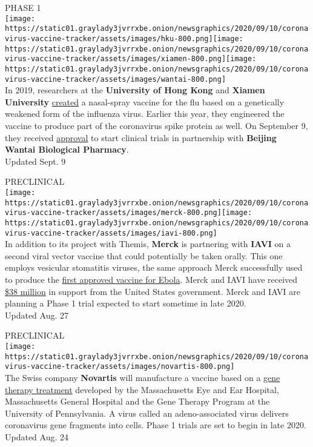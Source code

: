 PHASE 1\\
\texttt{[image: https://static01.graylady3jvrrxbe.onion/newsgraphics/2020/09/10/coronavirus-vaccine-tracker/assets/images/hku-800.png]}\texttt{[image: https://static01.graylady3jvrrxbe.onion/newsgraphics/2020/09/10/coronavirus-vaccine-tracker/assets/images/xiamen-800.png]}\texttt{[image: https://static01.graylady3jvrrxbe.onion/newsgraphics/2020/09/10/coronavirus-vaccine-tracker/assets/images/wantai-800.png]}\\
In 2019, researchers at the \textbf{\textbf{University of Hong Kong}}
and \textbf{\textbf{Xiamen University}}
\href{https://mbio.asm.org/content/10/5/e02180-19}{created} a
nasal-spray vaccine for the flu based on a genetically weakened form of
the influenza virus. Earlier this year, they engineered the vaccine to
produce part of the coronavirus spike protein as well. On September 9,
they received
\href{https://www.hku.hk/press/news_detail_21583.html}{approval} to
start clinical trials in partnership with \textbf{\textbf{Beijing Wantai
Biological Pharmacy}}.\\
Updated Sept. 9

PRECLINICAL\\
\texttt{[image: https://static01.graylady3jvrrxbe.onion/newsgraphics/2020/09/10/coronavirus-vaccine-tracker/assets/images/merck-800.png]}\texttt{[image: https://static01.graylady3jvrrxbe.onion/newsgraphics/2020/09/10/coronavirus-vaccine-tracker/assets/images/iavi-800.png]}\\
In addition to its project with Themis, \textbf{\textbf{Merck}} is
partnering with \textbf{\textbf{IAVI}} on a second viral vector vaccine
that could potentially be taken orally. This one employs vesicular
stomatitis viruses, the same approach Merck successfully used to produce
the
\href{https://www.fda.gov/news-events/press-announcements/first-fda-approved-vaccine-prevention-ebola-virus-disease-marking-critical-milestone-public-health}{first
approved vaccine for Ebola}. Merck and IAVI have received
\href{https://medicalcountermeasures.gov/newsroom/2020/merck-iavi/}{\$38
million} in support from the United States government. Merck and IAVI
are planning a Phase 1 trial expected to start sometime in late 2020.\\
Updated Aug. 27

PRECLINICAL\\
\texttt{[image: https://static01.graylady3jvrrxbe.onion/newsgraphics/2020/09/10/coronavirus-vaccine-tracker/assets/images/novartis-800.png]}\\
The Swiss company \textbf{\textbf{Novartis}} will manufacture a vaccine
based on a
\href{https://www.nytimes3xbfgragh.onion/2020/05/04/health/gene-therapy-harvard-coronavirus.html}{gene
therapy treatment} developed by the Massachusetts Eye and Ear Hospital,
Massachusetts General Hospital and the Gene Therapy Program at the
University of Pennsylvania. A virus called an adeno-associated virus
delivers coronavirus gene fragments into cells. Phase 1 trials are set
to begin in late 2020.\\
Updated Aug. 24

